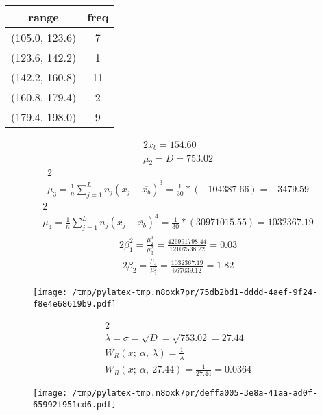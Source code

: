 \documentclass{article}%
\begin{document}
%
\normalsize%
\begin{tabular}{c|c}
\toprule
         range &  freq \\
\midrule
(105.0, 123.6) &     7 \\
(123.6, 142.2) &     1 \\
(142.2, 160.8) &    11 \\
(160.8, 179.4) &     2 \\
(179.4, 198.0) &     9 \\
\bottomrule
\end{tabular}
%
\begin{alignat*}{2}%
\overline {{ x_{{b}} }} = 154.60%
\\ \mu_2 = D = 753.02%
\end{alignat*}%
\begin{alignat*}{2}%
\\ \mu_3
            = \frac 1 n \sum\limits_{j = 1}^L {n_j (x_j - \overline {{ x_{{b}} }})^3}
            = \frac 1 { 30 } * (-104387.66)
            = -3479.59
\end{alignat*}%
\begin{alignat*}{2}%
\\ \mu_4
            = \frac 1 n \sum\limits_{j = 1}^L {n_j (x_j - \overline {{ x_{{b}} }})^4}
            = \frac 1 { 30 } * (30971015.55)
            = 1032367.19
\end{alignat*}%
\begin{alignat*}{2}%
\beta_1^2
            = \frac {\mu_2^3} {\mu_3^2}
            = \frac {426991798.44} {12107538.22}
            = 0.03
\end{alignat*}%
\begin{alignat*}{2}%
\beta_2
            = \frac {\mu_4} {\mu_2^2}
            = \frac {1032367.19} {567039.12}
            = 1.82
\end{alignat*}%


\begin{figure}[H]%
\centering%
\texttt{[image: /tmp/pylatex-tmp.n8oxk7pr/75db2bd1-dddd-4aef-9f24-f8e4e68619b9.pdf]}%
\end{figure}

%
\begin{alignat*}{2}%
\\ \lambda
            = \sigma
            = \sqrt D
            = \sqrt {753.02}
            = 27.44
\\ W_R(x; ~ \alpha, ~ \lambda)
            = \frac 1 \lambda
\\ W_R(x; ~ \alpha, ~ 27.44)
            = \frac 1 {27.44}
            = 0.0364
\end{alignat*}%


\begin{figure}[H]%
\centering%
\texttt{[image: /tmp/pylatex-tmp.n8oxk7pr/deffa005-3e8a-41aa-ad0f-65992f951cd6.pdf]}%
\end{figure}

%
\end{document}
